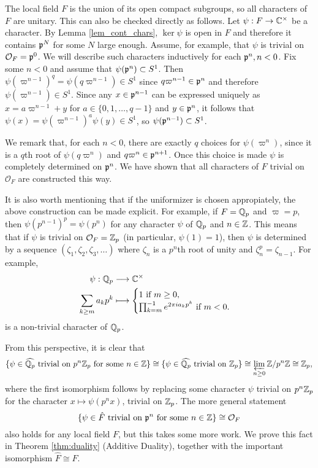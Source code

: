 \begin{example}
    The local field $F$ is the union of its open compact subgroups, so all characters of $F$ are unitary. This can also be checked directly as follows. Let $\psi:F\to\mathbb{C}^\times$ be a character. By Lemma \ref{lem_cont_chars}, $\ker\psi$ is open in $F$ and therefore it contains $\mathfrak{p}^N$ for some $N$ large enough. Assume, for example, that $\psi$ is trivial on $\mathcal{O}_F=\mathfrak{p}^0$. We will describe such characters inductively for each $\mathfrak{p}^n, n<0$. Fix some $n<0$ and assume that $\psi(\mathfrak{p}^n)\subset S^1$. Then $\psi(\varpi^{n-1})^q=\psi(q\varpi^{n-1})\in S^1$ since $q\varpi^{n-1}\in\mathfrak{p}^n$ and therefore $\psi(\varpi^{n-1})\in S^1$. Since any $x\in\mathfrak{p}^{n-1}$ can be expressed uniquely as $x=a\varpi^{n-1}+y$ for $a\in\{0,1,\ldots,q-1\}$ and $y\in \mathfrak{p}^n$, it follows that $\psi(x)=\psi(\varpi^{n-1})^a\psi(y)\in S^{1}$, so $\psi(\mathfrak{p}^{n-1})\subset S^1$.
    
    
    We remark that, for each $n<0$, there are exactly $q$ choices for $\psi(\varpi^n)$, since it is a $q$th root of $\psi(q\varpi^{n})$ and $q\varpi^{n}\in\mathfrak{p}^{n+1}$. Once this choice is made $\psi$ is completely determined on $\mathfrak{p}^n$. We have shown that all characters of $F$ trivial on $\mathcal{O}_F$ are constructed this way.

    It is also worth mentioning that if the uniformizer is chosen appropiately, the above construction can be made explicit. For example, if $F=\mathbb{Q}_p$ and $\varpi=p$, then $\psi(p^{n-1})^p=\psi(p^{n})$ for any character $\psi$ of $\mathbb{Q}_p$ and $n\in\mathbb{Z}$. This means that if $\psi$ is trivial on $\mathcal{O}_F=\mathbb{Z}_p$ (in particular, $\psi(1)=1$), then $\psi$ is determined by a sequence $(\zeta_1,\zeta_2,\zeta_3,\ldots)$ where $\zeta_n$ is a $p^n$th root of unity and $\zeta_n^p=\zeta_{n-1}$. For example,
    \begin{align*}
        \psi:\mathbb{Q}_p&\longrightarrow \mathbb{C}^\times\\
        \sum_{k\geq m} a_kp^k&\longmapsto
        \begin{cases}
            1 \text{ if } m\geq 0,\\
            \prod_{k=m}^{-1}e^{2\pi i a_kp^k} \text{ if } m < 0.\\
        \end{cases}
    \end{align*}
    is a non-trivial character of $\mathbb{Q}_p$.
    
    
    From this perspective, it is clear that
    $$\{\psi\in\widehat{\mathbb{Q}_p}\text{ trivial on } p^n\mathbb{Z}_p \text{ for some }n\in\mathbb{Z} \}\cong\{\psi\in\widehat{\mathbb{Q}_p}\text{ trivial on } \mathbb{Z}_p \}\cong \varprojlim_{n\geq 0} \mathbb{Z}/p^n\mathbb{Z}\cong \mathbb{Z}_p,$$
    where the first isomorphism follows by replacing some character $\psi$ trivial on $p^n\mathbb{Z}_p$ for the character $x\mapsto\psi(p^n x)$, trivial on $\mathbb{Z}_p$. The more general statement 
    $$\{\psi\in\hat{F}\text{ trivial on } \mathfrak{p}^n \text{ for some }n\in\mathbb{Z} \}\cong \mathcal{O}_F$$
    also holds for any local field $F$, but this takes some more work. We prove this fact in Theorem \ref{thm:duality} (Additive Duality), together with the important isomorphism $\hat{F}\cong F$.

\end{example}

